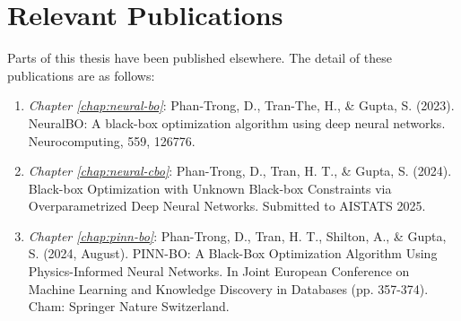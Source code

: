 \chapter*{Relevant Publications}
{}
Parts of this thesis have been published elsewhere. The detail of these publications are as follows:

\begin{enumerate}
    \item \textit{Chapter \ref{chap:neural-bo}}: Phan-Trong, D., Tran-The, H., \& Gupta, S. (2023). NeuralBO: A black-box optimization algorithm using deep neural networks. Neurocomputing, 559, 126776.
    \item \textit{Chapter \ref{chap:neural-cbo}}: Phan-Trong, D., Tran, H. T., \& Gupta, S. (2024). Black-box Optimization with Unknown Black-box Constraints via Overparametrized Deep Neural Networks. Submitted to AISTATS 2025.  
    \item \textit{Chapter \ref{chap:pinn-bo}}: Phan-Trong, D., Tran, H. T., Shilton, A., \& Gupta, S. (2024, August). PINN-BO: A Black-Box Optimization Algorithm Using Physics-Informed Neural Networks. In Joint European Conference on Machine Learning and Knowledge Discovery in Databases (pp. 357-374). Cham: Springer Nature Switzerland.
    
\end{enumerate}